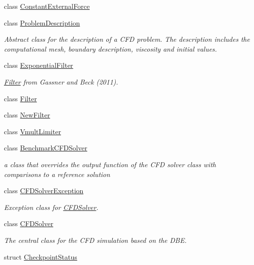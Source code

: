 \begin{DoxyCompactItemize}
class \hyperlink{classnatrium_1_1ConstantExternalForce}{ConstantExternalForce}
\item 
class \hyperlink{classnatrium_1_1ProblemDescription}{ProblemDescription}
\begin{DoxyCompactList}\small\item\em Abstract class for the description of a CFD problem. The description includes the computational mesh, boundary description, viscosity and initial values. \item\end{DoxyCompactList}\item 
class \hyperlink{classnatrium_1_1ExponentialFilter}{ExponentialFilter}
\begin{DoxyCompactList}\small\item\em \hyperlink{classnatrium_1_1Filter}{Filter} from Gassner and Beck (2011). \item\end{DoxyCompactList}\item 
class \hyperlink{classnatrium_1_1Filter}{Filter}
\item 
class \hyperlink{classnatrium_1_1NewFilter}{NewFilter}
\item 
class \hyperlink{classnatrium_1_1VmultLimiter}{VmultLimiter}
\item 
class \hyperlink{classnatrium_1_1BenchmarkCFDSolver}{BenchmarkCFDSolver}
\begin{DoxyCompactList}\small\item\em a class that overrides the output function of the CFD solver class with comparisons to a reference solution \item\end{DoxyCompactList}\item 
class \hyperlink{classnatrium_1_1CFDSolverException}{CFDSolverException}
\begin{DoxyCompactList}\small\item\em Exception class for \hyperlink{classnatrium_1_1CFDSolver}{CFDSolver}. \item\end{DoxyCompactList}\item 
class \hyperlink{classnatrium_1_1CFDSolver}{CFDSolver}
\begin{DoxyCompactList}\small\item\em The central class for the CFD simulation based on the DBE. \item\end{DoxyCompactList}\item 
struct \hyperlink{structnatrium_1_1CheckpointStatus}{CheckpointStatus}

\end{DoxyCompactItemize}
